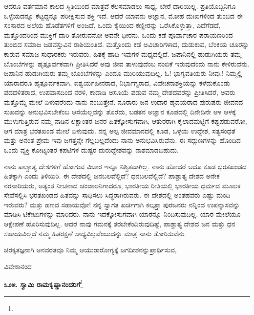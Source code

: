 ಆದರೂ ವರ್ತಮಾನ ಕಾಲದ ಸ್ಥಿತಿಯಿಂದ ಮಾತ್ರವೆ ಕೆಲಸಮಾಡಲು ಸಾಧ್ಯ. ಬೇರೆ ದಾರಿಯಿಲ್ಲ. ಪ್ರತಿಯೊಬ್ಬನಿಗೂ ಒಳ್ಳೆಯದನ್ನೂ ಕೆಟ್ಟದ್ದನ್ನೂ ಪರೀಕ್ಷಿಸುವ ಶಕ್ತಿ ಇದೆ. ಆದರೆ ಯಾವನು ಅಜ್ಞಾನ, ಮೋಹ ದುಃಖಗಳಿಂದ ತುಂಬಿದ ಈ ಸಂಸಾರದ ಅಲೆಯ ಹೊಡೆತಗಳಿಗೆ ಅಂಜದೆ, ಒಂದು ಕೈಯಿಂದ ಕಣ್ಣೀರನ್ನು ಒರೆಸಿಕೊಳ್ಳುತ್ತಾ, ಎದೆಗೆಡದೆ, ಮತ್ತೊಂದರಿಂದ ಮುಕ್ತಿಗೆ ದಾರಿ ತೋರುವನೋ ಅವನೇ ಧೀರನು. ಒಂದು ಕಡೆ ಪೂರ್ವಾಚಾರ ಪರಾಯಣರಿಂದ ತುಂಬಿದ ಸಮಾಜ ಜಡವಸ್ತುವಿನ ರಾಶಿಯಂತಿದೆ. ಮತ್ತೊಂದು ಕಡೆ ಅವಿಚಾರಿಗಳಾದ, ದುಡುಕುವ, ಬೆಂಕಿಯ ಚೂರನ್ನು ಕಾರುವ ಸಮಾಜ ಸುಧಾರಕರು ಇರುವರು. ಹಿತಕ್ಕೆ ಹಾದಿ ಇವುಗಳ ಮಧ್ಯದಲ್ಲಿದೆ. ಜಪಾನಿನಲ್ಲಿ ಹುಡುಗಿಯರು ತಮ್ಮ ಬೊಂಬೆಗಳನ್ನು ಹೃತ್ಪೂರ್ವಕವಾಗಿ ಪ್ರೀತಿಸಿದರೆ ಅವು ಜೀವ ತಾಳುವುದೆಂಬ ನಂಬಿಕೆ ಇರುವುದೆಂದು ನಾನು ಕೇಳಿರುವೆನು. ಜಪಾನಿನ ಹುಡುಗಿಯರು ತಮ್ಮ ಬೊಂಬೆಗಳನ್ನು ಎಂದೂ ಮುರಿಯುವುದಿಲ್ಲ. ಓ! ಭಾಗ್ಯವತಿಯರು ನೀವು.! ನಿಮ್ಮಲ್ಲಿ ಯಾರಾದರೂ ಹೃತ್ಪೂರ್ವಕವಾಗಿ, ಐಶ್ವರ್ಯಹೀನರಾದ, ನಿರ್ಭಾಗ್ಯರಾದ, ವಿವೇಚನಾಶಕ್ತಿಯನ್ನು ಕಳೆದುಕೊಂಡು ಪದದಳಿತರಾದ, ಉಪವಾಸದಿಂದ ನರಳಿ, ಕಾದಾಡಿ ಅಸೂಯೆ ಪಡುವ ನಮ್ಮ ದೇಶದವರನ್ನು ಪ್ರೀತಿಸಿದರೆ, ಅವರು ಮತ್ತೊಮ್ಮೆ ಮೇಲೆ ಏಳುವರೆಂದು ನಾನು ನಂಬುತ್ತೇನೆ. ನೂರಾರು ಜನ ಉದಾರ ಹೃದಯರಾದ ಪುರುಷರು ಜೀವನದ ಸುಖವನ್ನು ಅನುಭವಿಸಬೇಕೆಂಬ ಆಸೆಯೆಲ್ಲವನ್ನು ತೊರೆದು, ಬಡತನ ಅಜ್ಞಾನ ಕೂಪದಲ್ಲಿ ದಿನೇದಿನೇ ಆಳ ಆಳಕ್ಕೆ ಮುಳುಗುತ್ತಿರುವ ನಮ್ಮ ನಾಡಿನ ಲಕ್ಷಾಂತರ ಜನರ ಹಿತಕ್ಕೋಸುಗವಾಗಿ, ಆತುರರಾಗಿ ಕೈಲಾದಮಟ್ಟಿಗೆ ಕಷ್ಟಪಡುವರೋ, ಆಗ ಮಾತ್ರ ಭರತಖಂಡ ಮೇಲೆ ಏಳುವುದು. ನನ್ನ ಅಲ್ಪ ಜೀವಮಾನದಲ್ಲಿ ಕೂಡ, ಒಳ್ಳೆಯ ಉದ್ದೇಶ, ಸತ್ಯಸಂಧತೆ ಮತ್ತು ಅನಂತ ಪ್ರೇಮ ಇವು ಜಗತ್ತನ್ನೇ ಗೆಲ್ಲಬಲ್ಲದೆಂದು ನಾನು ಅನುಭವಿಸಿರುವೆನು. ಈ ಸದ್ಗುಣಗಳನ್ನು ಹೊಂದಿದ ಒಂದು ವ್ಯಕ್ತಿ ಕೋಟ್ಯಂತರ ಕಪಟಿಗಳ ದುಷ್ಟರ ದುರುದ್ದೇಶವನ್ನು ನಾಶಮಾಡಬಹುದು.

ನಾನು ಪಾಶ್ಚಾತ್ಯ ದೇಶಗಳಿಗೆ ಹೋಗುವ ವಿಚಾರ ಇನ್ನೂ ನಿಶ್ಚಿತವಾಗಿಲ್ಲ. ನಾನು ಹೋದರೆ ಅದೂ ಕೂಡ ಭರತಖಂಡದ ಹಿತಕ್ಕಾಗಿ ಎಂದು ತಿಳಿಯಿರಿ. ಈ ದೇಶದಲ್ಲಿ ಜನಬಲವೆಲ್ಲಿದೆ? ಧನಬಲವೆಲ್ಲಿದೆ? ಪಾಶ್ಚಾತ್ಯ ದೇಶದ ಅನೇಕ ನರನಾರಿಯರು, ಅತ್ಯಂತ ನೀಚನಾದ ಚಂಡಾಲನಿಗಾದರೂ, ಭಾರತೀಯ ರೀತಿಯಲ್ಲಿ ಭಾರತೀಯ ಧರ್ಮದ ಮೂಲಕ ಸೇವೆಸಲ್ಲಿಸಿ ಭರತಖಂಡದ ಹಿತವನ್ನು ಸಾಧಿಸಲು ಸಿದ್ಧರಾಗಿರುವರು. ಈ ದೇಶದಲ್ಲಿ ಅಂತಹವರು ಎಷ್ಟು ಮಂದಿ ಇರುವರು? ಮತ್ತು ಹಣದ ಸಹಾಯವೋ! ನನ್ನ ಸ್ವಾಗತ ಖರ್ಚಿಗಾಗಿ ಕಲ್ಕತ್ತಾ ಪುರಜನರು ನನ್ನಿಂದ ಉಪನ್ಯಾಸವನ್ನು ಮಾಡಿಸಿ ಟಿಕೇಟುಗಳನ್ನು ಮಾರಿದರು. ನಾನು ಇದಕ್ಕೋಸುಗವಾಗಿ ಯಾರನ್ನೂ ನಿಂದಿಸುವುದಿಲ್ಲ. ಯಾರ ಮೇಲೆಯೂ ಆಕ್ಷೇಪಣೆ ಹೊರಿಸುವುದಿಲ್ಲ. ಆದರೆ ನಾವು ಗಮನಕ್ಕೆ ತರಬೇಕೆಂದಿರುವುದಿಷ್ಟೆ, ಪಾಶ್ಚಾತ್ಯ ದೇಶದ ಜನ ಮತ್ತು ಧನ ಸಹಾಯವಿಲ್ಲದೆ ನಮ್ಮ ಹಿತರಕ್ಷಣೆ ಸಾಧ್ಯವಿಲ್ಲವೆಂಬುದನ್ನು ಮಾತ್ರ ನಾನು ತೋರಿಸುವೆನು.

ಚಿರಕೃತಜ್ಞನಾಗಿ ಅನವರತವೂ ನಿಮ್ಮ ಆಯುರಾರೋಗ್ಯಕ್ಕೆ ಜಗದೀಶನನ್ನು\break ಪ್ರಾರ್ಥಿಸುವ,

\vspace{-0.5cm}

{\flushright
ವಿವೇಕಾನಂದ\par}

\begin{center}
\textbf{೩೨೫. ಸ್ವಾಮಿ ರಾಮಕೃಷ್ಣಾನಂದರಿಗೆ}\footnote{}
\end{center}

